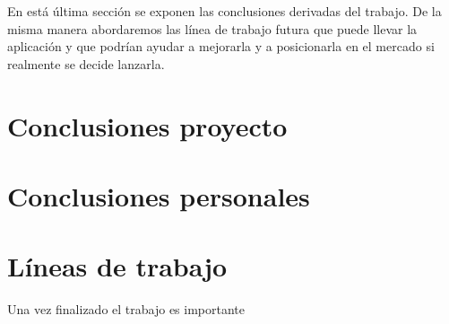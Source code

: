 
En está última sección se exponen las conclusiones derivadas del trabajo. De la misma manera abordaremos las línea de trabajo futura que puede llevar la aplicación y que podrían ayudar a mejorarla y a posicionarla en el mercado si realmente se decide lanzarla.


  \section{Conclusiones proyecto}\label{conclusiones}
  
  
  \section{Conclusiones personales}\label{conclusiones}
  
  
   \section{Líneas de trabajo}\label{conclusiones}
   Una vez finalizado el trabajo es importante 
